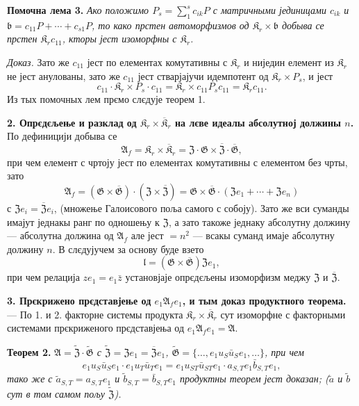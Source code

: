 \documentclass[11pt]{article}
\begin{document}
\noindent\textbf{Помочна лема 3.} \emph{Ако положимо \(P_s=\sum_1^s c_{ik}P\) с матричными јединицами \(c_{ik}\) и \(\mathfrak b=c_{11}P+\cdots+c_{s1}P\), то како прстен автоморфизмов од \(\mathfrak K_r\times\mathfrak b\) добыва се прстен \(\mathfrak K_rc_{11}\), кторы јест изоморфны с \(\mathfrak K_r\).}

\noindent\emph{Доказ.} Зато же \(c_{11}\) јест по елементах комутативны с \(\mathfrak K_r\) и ниједин елемент из \(\mathfrak K_r\) не јест анулованы, зато же \(c_{11}\) јест стварјајучи идемпотент од \(\mathfrak K_r\times P_s\), и јест
\[
c_{11}\cdot\mathfrak K_r\times P_s\cdot c_{11}
=\mathfrak K_r\times c_{11}P_sc_{11}
=\mathfrak K_rc_{11}.
\]
Из тых помочных лем прємо слєдује теорем 1.

\noindent\textbf{2. Опрєдєљење и разклад од \(\mathfrak K_r\times\overline{\mathfrak K}_r\) на лєве идеалы абсолутној должины \(n\).} По дефиницији добыва се
\[
\mathfrak A_f=\mathfrak K_r\times\overline{\mathfrak K}_r
=\mathfrak Z\cdot\mathfrak G\times\overline{\mathfrak Z}\cdot\overline{\mathfrak G},
\]
при чем елемент с чртоју јест по елементах комутативны с елементом без чрты, зато
\[
\mathfrak A_f
=(\mathfrak G\times\overline{\mathfrak G})\cdot(\mathfrak Z\times\overline{\mathfrak Z})
=\mathfrak G\times\overline{\mathfrak G}\cdot(\mathfrak Ze_1+\cdots+\mathfrak Ze_n)
\]
с \(\mathfrak Ze_i=\overline{\mathfrak Z}e_i\), (множење Галоисового поља самого с собоју). Зато же вси суманды имајут једнакы ранг по одношењу к \(\mathfrak Z\), а зато такоже једнаку абсолутну должину --- абсолутна должина од \(\mathfrak A_f\) але јест \(=n^2\) --- всакы суманд имаје абсолутну должину \(n\). В слєдујучем за основу буде взето
\[
\mathfrak l=(\mathfrak G\times\overline{\mathfrak G})\mathfrak Ze_1,
\]
при чем релација \(ze_1=e_1\bar z\) установјаје опрєдєљены изоморфизм меджу \(\mathfrak Z\) и \(\overline{\mathfrak Z}\).

\noindent\textbf{3. Прєкрижено прєдставјење од \(e_1\mathfrak A_fe_1\), и тым доказ продуктного теорема.} --- По 1. и 2. факторне системы продукта \(\mathfrak K_r\times\overline{\mathfrak K}_r\) сут изоморфне с факторными системами прєкриженого прєдставјења од \(e_1\mathfrak A_fe_1=\mathfrak A\).

\noindent\textbf{Теорем 2.} \emph{\(\mathfrak A=\widetilde{\mathfrak Z}\cdot\widetilde{\mathfrak G}\) с \(\widetilde{\mathfrak Z}=\mathfrak Ze_1=\overline{\mathfrak Z}e_1\), \(\widetilde{\mathfrak G}=\{\ldots,e_1u_S\bar u_Se_1,\ldots\}\), при чем
\[
e_1u_S\bar u_Se_1\cdot e_1u_T\bar u_Te_1
=e_1u_{ST}\bar u_{ST}e_1\cdot a_{S,T}e_1\bar b_{S,T}e_1,
\]
тако же с \(\tilde a_{S,T}=a_{S,T}e_1\) и \(\tilde b_{S,T}=\bar b_{S,T}e_1\) продуктны теорем јест доказан; (\(\tilde a\) и \(\tilde b\) сут в том самом пољу \(\widetilde{\mathfrak Z}\)).}
\end{document}
